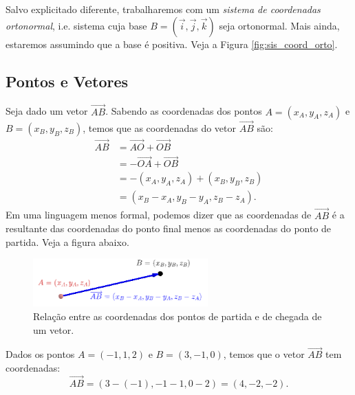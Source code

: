 Salvo explicitado diferente, trabalharemos com um \emph{sistema de coordenadas ortonormal}, i.e. sistema cuja base $B = (\vec{i},\vec{j},\vec{k})$ seja ortonormal. Mais ainda, estaremos assumindo que a base é positiva. Veja a Figura \ref{fig:sis_coord_orto}.

\subsection{Pontos e Vetores}

  
Seja dado um vetor $\overrightarrow{AB}$. Sabendo as coordenadas dos pontos $A = (x_A,y_A,z_A)$ e $B = (x_B,y_B,z_B)$, temos que as coordenadas do vetor $\overrightarrow{AB}$ são:
\begin{align}
  \overrightarrow{AB} &= \overrightarrow{AO} + \overrightarrow{OB}\\
                      &= -\overrightarrow{OA} + \overrightarrow{OB}\\
                      &= -(x_A,y_A,z_A)+(x_B,y_B,z_B)\\
                      &= (x_B-x_A,y_B-y_A,z_B-z_A).
\end{align}
Em uma linguagem menos formal, podemos dizer que as coordenadas de $\overrightarrow{AB}$ é a resultante das coordenadas do ponto final menos as coordenadas do ponto de partida. Veja a figura abaixo.

\begin{figure}[H]
\centering
\includegraphics[width=0.6\textwidth]{./cap_estudo/dados/fig_scoord_vec_pt/fig}
\caption{Relação entre as coordenadas dos pontos de partida e de chegada de um vetor.}
\label{fig:scoord_vec_pt}
\end{figure}  

\begin{ex}
  Dados os pontos $A = (-1,1,2)$ e $B = (3,-1,0)$, temos que o vetor $\overrightarrow{AB}$ tem coordenadas:
  \begin{equation}
    \overrightarrow{AB} = (3-(-1),-1-1,0-2) = (4,-2,-2).
  \end{equation}
\end{ex}

